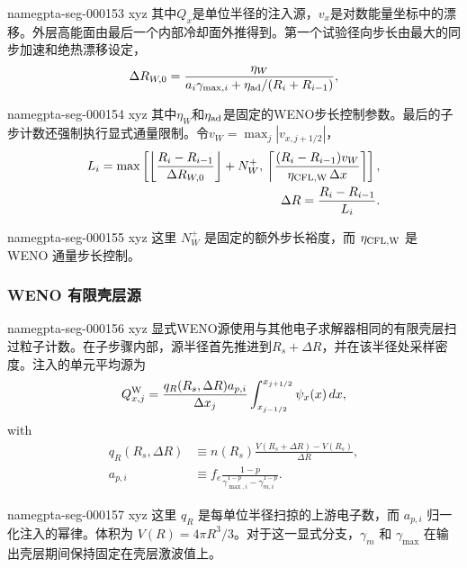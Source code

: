 \documentclass[twocolumn]{aastex702}
\makeatletter
\providecommand{\gptareaderanchor}[1]{\pdfdest name{#1} xyz}%
\providecommand{\gptareaderanchor}[1]{\special{pdf:dest (#1) [ @thispage /XYZ @xpos @ypos null ]}}%
\makeatother
\begin{document}
\gptareaderanchor{gpta-seg-000153}%
其中\(Q_x\)是单位半径的注入源，\(v_x\)是对数能量坐标中的漂移。外层高能面由最后一个内部冷却面外推得到。第一个试验径向步长由最大的同步加速和绝热漂移设定，
\begin{equation}
\Delta R_{W,0}=
\frac{\eta_W}
{a_i\gamma_{\max,i}+\eta_{\rm ad}/(R_i+R_{i-1})},
\end{equation}

\gptareaderanchor{gpta-seg-000154}%
其中\(\eta_W\)和\(\eta_{\rm ad}\)是固定的WENO步长控制参数。最后的子步计数还强制执行显式通量限制。令\(v_W=\max_j|v_{x,j+1/2}|\)，
\begin{equation}
\begin{aligned}
L_i=\max\left[
\left\lfloor\frac{R_i-R_{i-1}}{\Delta R_{W,0}}\right\rfloor+N_W^+,\,
\left\lceil
\frac{(R_i-R_{i-1})v_W}
{\eta_{\rm CFL,W}\,\Delta x}
\right\rceil
\right],\\
\Delta R=\frac{R_i-R_{i-1}}{L_i}.
\end{aligned}
\end{equation}

\gptareaderanchor{gpta-seg-000155}%
这里 \(N_W^+\) 是固定的额外步长裕度，而 \(\eta_{\rm CFL,W}\) 是 WENO 通量步长控制。

\subsubsection{WENO 有限壳层源}


\gptareaderanchor{gpta-seg-000156}%
显式WENO源使用与其他电子求解器相同的有限壳层扫过粒子计数。在子步骤内部，源半径首先推进到\(R_s+\Delta R\)，并在该半径处采样密度。注入的单元平均源为
\begin{equation}
Q_{x,j}^{\rm W}=
\frac{q_R(R_s,\Delta R)a_{p,i}}{\Delta x_j}
\int_{x_{j-1/2}}^{x_{j+1/2}}
\psi_x(x)\,dx ,
\end{equation}
with
\begin{equation}
\begin{aligned}
q_R(R_s,\Delta R)&\equiv
n(R_s)\frac{V(R_s+\Delta R)-V(R_s)}{\Delta R},\\
a_{p,i}&\equiv
f_e\frac{1-p}{\gamma_{\max,i}^{1-p}-\gamma_{m,i}^{1-p}} .
\end{aligned}
\end{equation}

\gptareaderanchor{gpta-seg-000157}%
这里 \(q_R\) 是每单位半径扫掠的上游电子数，而 \(a_{p,i}\) 归一化注入的幂律。体积为 \(V(R)=4\pi R^3/3\)。对于这一显式分支，\(\gamma_m\) 和 \(\gamma_{\max}\) 在输出壳层期间保持固定在壳层激波值上。
\end{document}
